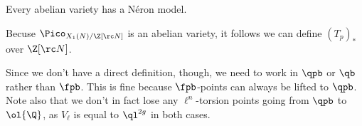 \begin{thm}
Every abelian variety has a N\'eron model.
\end{thm}

Becuse $\Pico_{X_1(N)/\Z[\rc N]}$ is an abelian variety, it follows we can define $(T_p)_*$ over $\Z[\rc N]$.

Since we don't have a direct definition, though, we need to work in $\qpb$ or $\qb$ rather than $\fpb$. This is fine because $\fpb$-points can always be lifted to $\qpb$. Note also that we don't in fact lose any $\ell^n$-torsion points going from $\qpb$ to $\ol{\Q}$, as $V_{\ell}$ is equal to $\ql^{2g}$ in both cases.


%
